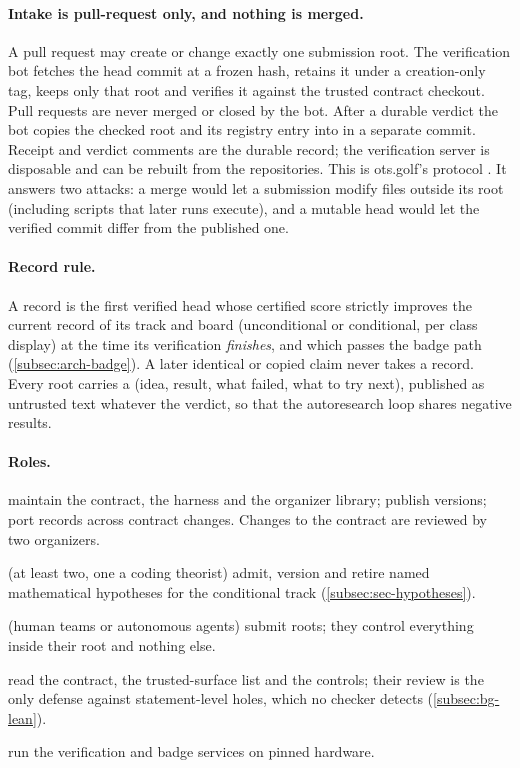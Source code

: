 \paragraph{Intake is pull-request only, and nothing is merged.} A pull request may create or change
exactly one submission root. The verification bot fetches the head commit at a frozen hash, retains
it under a creation-only tag, keeps only that root and verifies it against the trusted contract
checkout. Pull requests are never merged or closed by the bot. After a durable verdict the bot
copies the checked root and its registry entry into  in a separate commit. Receipt and
verdict comments are the durable record; the verification server is disposable and can be rebuilt
from the repositories. This is ots.golf's protocol \cite{otsgolf2026}. It answers two attacks: a
merge would let a submission modify files outside its root (including scripts that later runs
execute), and a mutable head would let the verified commit differ from the published one.

\paragraph{Record rule.} A record is the first verified head whose certified score strictly
improves the current record of its track and board (unconditional or conditional, per class
display) at the time its verification \emph{finishes}, and which passes the badge path
(\cref{subsec:arch-badge}). A later identical or copied claim never takes a record. Every root
carries a  (idea, result, what failed, what to try next), published as untrusted
text whatever the verdict, so that the autoresearch loop shares negative results.

\paragraph{Roles.}
\begin{description}[nosep,leftmargin=1.2em]
\item[Organizers] maintain the contract, the harness and the organizer library; publish versions;
  port records across contract changes. Changes to the contract are reviewed by two organizers.
\item[Hypothesis reviewers] (at least two, one a coding theorist) admit, version and retire named
  mathematical hypotheses for the conditional track (\cref{subsec:sec-hypotheses}).
\item[Submitters] (human teams or autonomous agents) submit roots; they control everything inside
  their root and nothing else.
\item[Auditors] read the contract, the trusted-surface list and the controls; their review is the
  only defense against statement-level holes, which no checker detects (\cref{subsec:bg-lean}).
\item[Harness operators] run the verification and badge services on pinned hardware.
\end{description}

